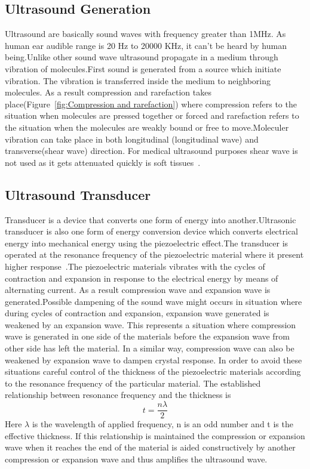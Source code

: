\subsection{Ultrasound Generation}
Ultrasound are basically sound waves with frequency greater than 1MHz. As human ear audible range is 20 Hz to 20000 KHz, it can't be heard by human being.Unlike other sound wave ultrasound propagate in a medium through vibration of molecules.First sound is generated from a source which initiate vibration. The vibration is transferred inside the medium to neighboring molecules. As a result compression and rarefaction takes place(Figure~\ref{fig:Compression and rarefaction}) where compression refers to the situation when molecules are pressed together or forced and rarefaction refers to the situation when the molecules are weakly bound or free to move.Moleculer vibration can take place in both longitudinal (longitudinal wave) and transverse(shear wave) direction. For medical ultrasound purposes shear wave is not used as it gets attenuated quickly is soft tissues~\cite{Hynynen...5,Carson.1978.JCU.126,Hunt.1987..354,Hynynen.1990..61}.




\subsection{Ultrasound Transducer}
Transducer is a device that converts one form of energy into another.Ultrasonic transducer is also one form of energy conversion device which converts electrical energy into mechanical energy using the piezoelectric effect.The transducer is operated at the resonance frequency of the piezoelectric material where it present higher response~\cite{Takasaki.2007..3817}.The piezoelectric materials vibrates with the cycles of contraction and expansion in response to the electrical energy by means of alternating current. As a result compression wave and expansion wave is generated.Possible dampening of the sound wave might occurs in situation where during cycles of contraction and expansion, expansion wave generated is weakened by an expansion wave. This represents a situation where compression wave is generated in one side of the materials before the expansion wave from other side has left the material. In a similar way, compression wave can also be weakened by expansion wave to dampen crystal response. In order to avoid these situations  careful control of the thickness of the piezoelectric materials according to the resonance frequency of the particular material. The established relationship between resonance frequency  and the thickness is
 \begin{equation}\label{Eq:Effectivethichness-frequency}
    t=\frac{n\lambda}{2}
\end{equation}
Here $\lambda$ is the wavelength of applied frequency, n is an odd number and t is the effective thickness.
If this relationship is maintained the compression or expansion wave when it reaches the end of the material is aided constructively by another compression or expansion wave and thus amplifies the ultrasound wave.

